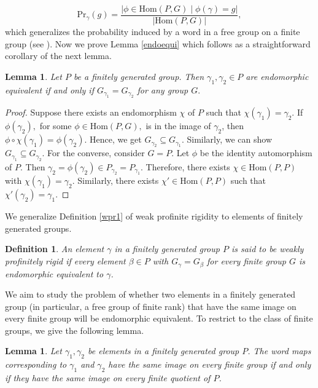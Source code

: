 \documentclass[12pt]{amsart}
\newtheorem{lemma}[theorem]{Lemma}
\newtheorem{definition}[theorem]{Definition}
\begin{document}
$$\mathrm{Pr}_{\gamma}(g) = \frac{|\phi \in \mathrm{Hom}(P,G) \mid \phi(\gamma) = g |}{|\mathrm{Hom}(P,G)|},$$ which generalizes the probability induced by a word in a free group on a finite group (see \cite{hanany2020some}). Now we prove Lemma \ref{endoequi} which follows as a straightforward corollary of the next lemma.
\begin{lemma}\label{fg}
    Let $P$ be a finitely generated group. Then $\gamma_1, \gamma_2 \in P$ are endomorphic equivalent if and only if  $G_{\gamma_1} = G_{\gamma_2}$ for any group $G.$
\end{lemma}
\begin{proof}
    Suppose there exists an endomorphism $\chi$ of $P$ such that $\chi(\gamma_1) = \gamma_2.$ If $\phi(\gamma_2),$ for some $\phi \in \mathrm{Hom}(P,G),$ is in the image of $\gamma_2$, then $\phi \circ \chi (\gamma_1) = \phi(\gamma_2)$. Hence, we get $G_{\gamma_2} \subseteq G_{\gamma_1}.$ Similarly, we can show  $G_{\gamma_1} \subseteq G_{\gamma_2}.$  For the converse, consider $G = P$. Let $\phi$ be the identity automorphism of $P.$ Then $\gamma_2 = \phi(\gamma_2) \in P_{\gamma_2} = P_{\gamma_1}.$ Therefore, there exists $\chi \in \mathrm{Hom}(P,P)$ with $\chi(\gamma_1) = \gamma_2$. Similarly, there exists $\chi' \in \mathrm{Hom}(P,P)$ such that $\chi'(\gamma_2) = \gamma_1$.
\end{proof}


We generalize Definition \ref{wpr1} of weak profinite rigidity to elements of finitely generated groups.

\begin{definition}\label{def1}
    An element $\gamma$ in a finitely generated group $P$ is said to be weakly profinitely rigid if every element $\beta \in P$ with $G_{\gamma}=G_{\beta}$ for every finite group $G$ is endomorphic equivalent to $\gamma$.
\end{definition}

We aim to study the problem of whether two elements in a finitely generated group (in particular, a free group of finite rank) that have the same image on every finite group will be endomorphic equivalent. To restrict to the class of finite groups, we give the following lemma.

 \begin{lemma}
    Let $\gamma_1, \gamma_2$ be elements in a finitely generated group $P$.  The word maps corresponding to $\gamma_1$ and $\gamma_2$ have the same image on every finite group if and only if they have the same image on every finite quotient of $P$.
 \end{lemma}
\end{document}
